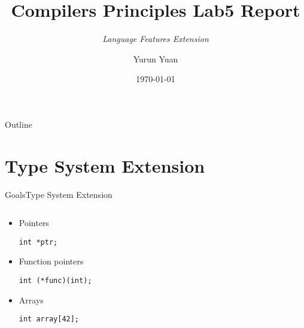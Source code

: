 \documentclass{beamer}
\title{Compilers Principles Lab5 Report }
\subtitle{\it{Language Features Extension}}
\author{Yurun Yuan}
\institute{CS, USTC}
\date{\today}
\begin{document}

\begin{frame}
    \titlepage
\end{frame}

\begin{frame}{Outline}
    \tableofcontents
\end{frame}


\section{Type System Extension}


\begin{frame}{Goals}{Type System Extension}
    \begin{columns}
        \begin{column}[]{0.5\textwidth}
            \begin{itemize}
                \item Pointers

                      \lstinline{int *ptr;}

                \item Function pointers

                      \lstinline{int (*func)(int);}

                \item Arrays

                      \lstinline{int array[42];}
            \end{itemize}
        \end{column}
        \begin{column}[]{0.5\textwidth}
        \end{column}
    \end{columns}
\end{frame}
\end{document}

